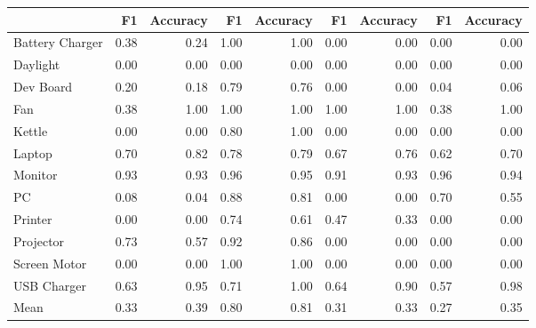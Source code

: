 \begin{tabular}{lrrrrrrrr}
\toprule
{} &    F1 &  Accuracy &    F1 &  Accuracy &    F1 &  Accuracy &    F1 &  Accuracy \\
\midrule
Battery Charger &  0.38 &      0.24 &  1.00 &      1.00 &  0.00 &      0.00 &  0.00 &      0.00 \\
Daylight        &  0.00 &      0.00 &  0.00 &      0.00 &  0.00 &      0.00 &  0.00 &      0.00 \\
Dev Board       &  0.20 &      0.18 &  0.79 &      0.76 &  0.00 &      0.00 &  0.04 &      0.06 \\
Fan             &  0.38 &      1.00 &  1.00 &      1.00 &  1.00 &      1.00 &  0.38 &      1.00 \\
Kettle          &  0.00 &      0.00 &  0.80 &      1.00 &  0.00 &      0.00 &  0.00 &      0.00 \\
Laptop          &  0.70 &      0.82 &  0.78 &      0.79 &  0.67 &      0.76 &  0.62 &      0.70 \\
Monitor         &  0.93 &      0.93 &  0.96 &      0.95 &  0.91 &      0.93 &  0.96 &      0.94 \\
PC              &  0.08 &      0.04 &  0.88 &      0.81 &  0.00 &      0.00 &  0.70 &      0.55 \\
Printer         &  0.00 &      0.00 &  0.74 &      0.61 &  0.47 &      0.33 &  0.00 &      0.00 \\
Projector       &  0.73 &      0.57 &  0.92 &      0.86 &  0.00 &      0.00 &  0.00 &      0.00 \\
Screen Motor    &  0.00 &      0.00 &  1.00 &      1.00 &  0.00 &      0.00 &  0.00 &      0.00 \\
USB Charger     &  0.63 &      0.95 &  0.71 &      1.00 &  0.64 &      0.90 &  0.57 &      0.98 \\
Mean            &  0.33 &      0.39 &  0.80 &      0.81 &  0.31 &      0.33 &  0.27 &      0.35 \\
\bottomrule
\end{tabular}
